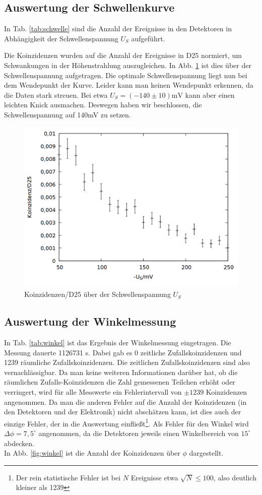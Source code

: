 \subsection{Auswertung der Schwellenkurve}
In Tab. \ref{tab:schwelle} sind die Anzahl der Ereignisse in den Detektoren in Abhängigkeit der Schwellenspannung $U_S$ aufgeführt. 

Die Koinzidenzen wurden auf die Anzahl der Ereignisse in D25 normiert, um Schwankungen in der Höhenstrahlung auszugleichen. In Abb. \ref{fig:schwelle} ist dies über der Schwellenspannung aufgetragen. Die optimale Schwellenspannung liegt nun bei dem Wendepunkt der Kurve. Leider kann man keinen Wendepunkt erkennen, da die Daten stark streuen. Bei etwa $U_S = (-140 \pm 10)\si{\milli \volt}$ kann aber einen leichten Knick ausmachen. Deswegen haben wir beschlossen, die Schwellenspannung auf 140\si{\milli \volt} zu setzen.

\begin{figure}
\centering
\includegraphics[width=0.75\linewidth]{data/friedrich/schwelle.png}
\caption{Koinzidenzen/D25 über der Schwellenspannung $U_S$}
\label{fig:schwelle}
\end{figure}

\subsection{Auswertung der Winkelmessung}
In Tab. \ref{tab:winkel} ist das Ergebnis der Winkelmessung eingetragen. Die Messung dauerte 1126731 \si{\second}. Dabei gab es 0 zeitliche Zufallskoinzidenzen und 1239 räumliche Zufallskoinzidenzen. Die zeitlichen Zufallskoinzidenzen sind also vernachlässigbar. Da man keine weiteren Informationen darüber hat, ob die räumlichen Zufalls-Koinzidenzen die Zahl gemessenen Teilchen erhöht oder verringert, wird für alle Messwerte ein Fehlerintervall von $\pm 1239$ Koinzidenzen angenommen. Da man die anderen Fehler auf die Anzahl der Koinzidenzen (in den Detektoren und der Elektronik) nicht abschätzen kann, ist dies auch der einzige Fehler, der in die Auswertung einfließt\footnote{Der rein statistische Fehler ist bei $N$ Ereignisse etwa $\sqrt{N} \leq 100$, also deutlich kleiner als 1239}. Als Fehler für den Winkel wird $\Delta \phi = 7,5^\circ$ angenommen, da die Detektoren jeweils einen Winkelbereich von $15^\circ$ abdecken.\\ 
In Abb. \ref{fig:winkel} ist die Anzahl der Koinzidenzen über $\phi$ dargestellt.

